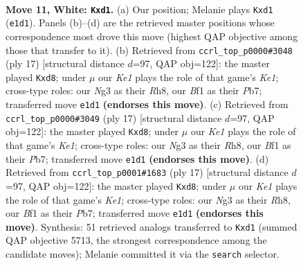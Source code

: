 \documentclass[11pt]{article}
\begin{document}
\clearpage

\begin{figure}[p]\centering
\begin{subfigure}{0.46\textwidth}\centering
\resizebox{\linewidth}{!}{%
\newchessgame
\chessboard[
  setfen={rn2kbnr/p5p1/2P3bp/1p2pp2/2P4P/6NR/PP3PP1/R1BqKBN1 w Qkq - 0 11},
  showmover=false,
  pgfstyle=straightmove, color=movearrow, markmove={e1-d1}
]}
\caption{}
\end{subfigure}\hfill
\begin{subfigure}{0.46\textwidth}\centering
\resizebox{\linewidth}{!}{%
\newchessgame
\chessboard[
  setfen={r1bQk1nr/1pp2ppp/1bn5/p3p3/2P5/P1N2N2/1P2PPPP/R1B1KB1R b KQkq - 0 9},
  showmover=false,
  pgfstyle=straightmove, color=movearrow, markmove={e8-d8}
]}
\caption{}
\end{subfigure}
\\[4pt]
\begin{subfigure}{0.46\textwidth}\centering
\resizebox{\linewidth}{!}{%
\newchessgame
\chessboard[
  setfen={r1bQk1nr/1pp2ppp/1bn5/p3p3/2P5/P1N2N2/1P2PPPP/R1B1KB1R b KQkq - 0 9},
  showmover=false,
  pgfstyle=straightmove, color=movearrow, markmove={e8-d8}
]}
\caption{}
\end{subfigure}\hfill
\begin{subfigure}{0.46\textwidth}\centering
\resizebox{\linewidth}{!}{%
\newchessgame
\chessboard[
  setfen={r1bQk1nr/1pp2ppp/1bn5/p3p3/2P5/P1N2N2/1P2PPPP/R1B1KB1R b KQkq - 0 9},
  showmover=false,
  pgfstyle=straightmove, color=movearrow, markmove={e8-d8}
]}
\caption{}
\end{subfigure}
\caption{\textbf{Move 11, White: \texttt{Kxd1}.} (a) Our position; Melanie plays \texttt{Kxd1} (\texttt{e1d1}). Panels (b)--(d) are the retrieved master positions whose correspondence most drove this move (highest QAP objective among those that transfer to it). (b) Retrieved from \texttt{ccrl\_top\_p0000\#3048} (ply 17) [structural distance $d$=97, QAP obj=122]: the master played \texttt{Kxd8}; under $\mu$ our \emph{Ke1} plays the role of that game's \emph{Ke1}; cross-type roles: our \emph{N}g3 as their \emph{R}h8, our \emph{B}f1 as their \emph{P}b7; transferred move \texttt{e1d1} \textbf{(endorses this move)}. (c) Retrieved from \texttt{ccrl\_top\_p0000\#3049} (ply 17) [structural distance $d$=97, QAP obj=122]: the master played \texttt{Kxd8}; under $\mu$ our \emph{Ke1} plays the role of that game's \emph{Ke1}; cross-type roles: our \emph{N}g3 as their \emph{R}h8, our \emph{B}f1 as their \emph{P}b7; transferred move \texttt{e1d1} \textbf{(endorses this move)}. (d) Retrieved from \texttt{ccrl\_top\_p0001\#1683} (ply 17) [structural distance $d$=97, QAP obj=122]: the master played \texttt{Kxd8}; under $\mu$ our \emph{Ke1} plays the role of that game's \emph{Ke1}; cross-type roles: our \emph{N}g3 as their \emph{R}h8, our \emph{B}f1 as their \emph{P}b7; transferred move \texttt{e1d1} \textbf{(endorses this move)}. Synthesis: 51 retrieved analogs transferred to \texttt{Kxd1} (summed QAP objective 5713, the strongest correspondence among the candidate moves); Melanie committed it via the \texttt{search} selector.}
\label{fig:thought-m20}
\end{figure}
\end{document}
